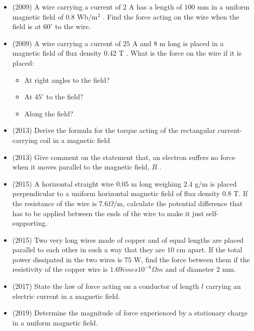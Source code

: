 \documentclass{article}
\begin{document}
\begin{itemize}
\item (2009)  A wire carrying a current of $ 2$ A has a length of $ 100$ mm in a uniform magnetic field of $ 0.8$ Wb$/$m$ ^{2}$ .  Find the force acting on the wire when the field is at $ 60^{\circ}$ to the wire.
\item (2009)  A wire carrying a current of $ 25$ A and $ 8$ m long is placed in a magnetic field of flux density $ 0.42$ T . What is the force on the wire if it is placed:
 \begin{itemize}
\item At right angles to the field?
\item At $ 45^{\circ}$ to the field?
\item Along the field?
\end{itemize}
\item (2013)  Derive the formula for the torque acting of the rectangular current-carrying coil in a magnetic field
\item (2013)  Give comment on the statement that, an electron suffers no force when it moves parallel to the magnetic field, $ B$ .
\item (2015)  A horizontal straight wire $ 0.05$ m long weighing $ 2.4$ g$/$m is placed perpendicular to a uniform horizontal magnetic field of flux density $ 0.8$ T.  If the resistance of the wire is $ 7.6\Omega /$m, calculate the potential difference that has to be applied between the ends of the wire to make it just self-supporting.
\item (2015)  Two very long wires made of copper and of equal lengths are placed parallel to each other in such a way that they are $ 10$ cm apart.  If the total power dissipated in the two wires is $ 75$ W, find the force between them if the resistivity of the copper wire is $ 1.69	imes 10^{-8}\Omega m$ and of diameter $ 2$ mm.
\item (2017)  State the law of force acting on a conductor of length $ l$ carrying an electric current in a magnetic field. 
\item (2019)  Determine the magnitude of force experienced by a stationary charge in a uniform magnetic field. 
\end{itemize}
\end{document}
